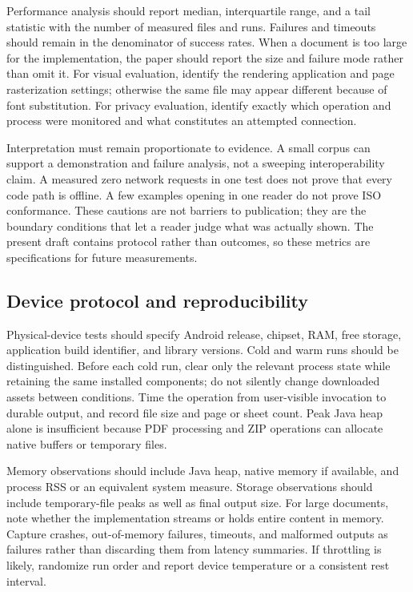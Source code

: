 \documentclass[10pt,letterpaper]{article}
\begin{document}
Performance analysis should report median, interquartile range, and a tail statistic with the number of measured files and runs. Failures and timeouts should remain in the denominator of success rates. When a document is too large for the implementation, the paper should report the size and failure mode rather than omit it. For visual evaluation, identify the rendering application and page rasterization settings; otherwise the same file may appear different because of font substitution. For privacy evaluation, identify exactly which operation and process were monitored and what constitutes an attempted connection.

Interpretation must remain proportionate to evidence. A small corpus can support a demonstration and failure analysis, not a sweeping interoperability claim. A measured zero network requests in one test does not prove that every code path is offline. A few examples opening in one reader do not prove ISO conformance. These cautions are not barriers to publication; they are the boundary conditions that let a reader judge what was actually shown. The present draft contains protocol rather than outcomes, so these metrics are specifications for future measurements.

\subsection{Device protocol and reproducibility}

Physical-device tests should specify Android release, chipset, RAM, free storage, application build identifier, and library versions. Cold and warm runs should be distinguished. Before each cold run, clear only the relevant process state while retaining the same installed components; do not silently change downloaded assets between conditions. Time the operation from user-visible invocation to durable output, and record file size and page or sheet count. Peak Java heap alone is insufficient because PDF processing and ZIP operations can allocate native buffers or temporary files.

Memory observations should include Java heap, native memory if available, and process RSS or an equivalent system measure. Storage observations should include temporary-file peaks as well as final output size. For large documents, note whether the implementation streams or holds entire content in memory. Capture crashes, out-of-memory failures, timeouts, and malformed outputs as failures rather than discarding them from latency summaries. If throttling is likely, randomize run order and report device temperature or a consistent rest interval.
\end{document}
